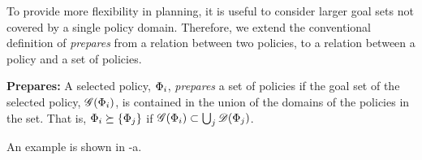   
To provide more flexibility in planning, it is useful to consider larger goal sets
not covered by a single policy domain.  Therefore, we extend the conventional
definition of \emph{prepares} from a relation between two policies, to a relation
between a policy and a set of policies.  
\begin{definition}{\bf Prepares:}
 A selected policy, $\Phi_i$, \emph{prepares} a set of policies if
the goal set of the selected policy, $\mathbf{\mathscr{G}}\!\left( \Phi_i \right)$, is contained in the
union of the domains of the policies in the set.  That is, $\Phi_i
\succeq \left\{ \Phi_j \right\}$ if $\mathbf{\mathscr{G}}\!\left( \Phi_i \right) \subset \operatorname*{\bigcup}_j \mathbf{\mathscr{D}}\!\left( \Phi_j \right)$. 
\label{def:prepares}
\end{definition}
An example is shown in -a.

